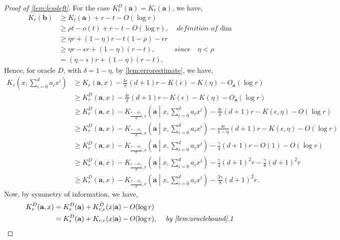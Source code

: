 \documentclass[a4paper,UKenglish,cleveref,autoref,thm-restate]{lipics-v2021}
\renewcommand{\dim}{{\mathrm{dim}}}
\begin{document}
\begin{proof}[Proof of \cref{lem:lessleft}]
	For the case $K_t^D(\mathbf{a})=K_t(\mathbf{a})$, we have, 
	\begin{align*}
		K_r(\mathbf{b})&\geq K_t(\mathbf{a})+r-t-O(\log r)\\
		&\geq\rho t-o(t)+r-t-O(\log r),&\textit{ definition of $\dim$}\\
		&\geq\eta r+(1-\eta)r-t(1-\rho)-\epsilon r\\
		&\geq\eta r-\epsilon r+(1-\eta)(r-t),&\textit{since }\textit{ $\eta<\rho$}\\
		&=(\eta-\epsilon)r+(1-\eta)(r-t).%
	\end{align*}
	Hence, for oracle $D$, with $\delta=1-\eta$, by \cref{lem:errorestimate}, we have, 
	\begin{align*}
		K_r\left(x,\sum_{i=0}^{d}a_ix^i\right)&\geq K_r(\mathbf{a},x)-\frac{4\epsilon}{\delta}(d+1)r-K(\epsilon)-K(\eta)-O_\mathbf{a}(\log r)\\
		&\geq K_r^D(\mathbf{a},x)-\frac{4\epsilon}{\delta}(d+1)r-K(\epsilon)-K(\eta)-O_\mathbf{a}(\log r)\\
		&\geq K_r^D(\mathbf{a},x)-K_{\frac{r-sh_j}{d},r}\left(\mathbf{a}\middle|x,\sum_{i=0}^{d}a_ix^i\right)-\frac{4\epsilon}{\delta}(d+1)r-K(\epsilon,\eta)-O(\log r)\\
		&\geq K_r^D(\mathbf{a},x)-K_{\frac{r-sh_j}{d},r}\left(\mathbf{a}\middle|x,\sum_{i=0}^{d}a_ix^i\right)-\frac{4\epsilon}{1-\eta}(d+1)r-K(\epsilon,\eta)-O(\log r)\\
		&\geq K_r^D(\mathbf{a},x)-K_{\frac{r-sh_j}{d},r}\left(\mathbf{a}\middle|x,\sum_{i=0}^{d}a_ix^i\right)-\frac{\gamma}{4}(d+1)r-O(1)-O(\log r)\\
		&\geq K_r^D(\mathbf{a},x)-K_{\frac{r-sh_j}{d},r}\left(\mathbf{a}\middle|x,\sum_{i=0}^{d}a_ix^i\right)-\frac{\gamma}{4}(d+1)^2r-\frac{\gamma}{8}(d+1)^2r\\
		&\geq K_r^D(\mathbf{a},x)-K_{\frac{r-sh_j}{d},r}\left(\mathbf{a}\middle|x,\sum_{i=0}^{d}a_ix^i\right)-\frac{3\gamma}{8}(d+1)^2r.
	\end{align*}
	Now, by symmetry of information, we have, 
	\begin{align*}
		K_r^D(\mathbf{a},x)&=K_r^D(\mathbf{a})+K_{r,r}^D(x|\mathbf{a})-O(\log r)\\
		&=K_r^D(\mathbf{a})+K_{r,r}(x|\mathbf{a})-O(\log r),&\textit{ by \cref{lem:oraclebound}.1}\\

\end{align*}
\end{proof}
\end{document}
